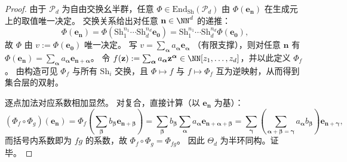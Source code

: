 \begin{proof}
由于 \(\mathcal P_d\) 为自由交换幺半群，任意 \(\Phi\in\mathrm{End}_{\mathrm{Sh}}(\mathcal P_d)\) 由 \(\Phi(\mathbf e_{\mathbf n})\) 在生成元上的取值唯一决定。
交换关系给出对任意 \(\mathbf n\in\NN^d\) 的递推：
\[
\Phi(\mathbf e_{\mathbf n})
=\Phi(\mathrm{Sh}_1^{n_1}\cdots \mathrm{Sh}_d^{n_d}\mathbf e_{\mathbf 0})
=\mathrm{Sh}_1^{n_1}\cdots \mathrm{Sh}_d^{n_d}\Phi(\mathbf e_{\mathbf 0}),
\]
故 \(\Phi\) 由 \(v:=\Phi(\mathbf e_{\mathbf 0})\) 唯一决定。
写
\(
v=\sum_{\boldsymbol\alpha}a_{\boldsymbol\alpha}\mathbf e_{\boldsymbol\alpha}
\)
（有限支撑），则对任意 \(\mathbf n\) 有
\(
\Phi(\mathbf e_{\mathbf n})=\sum_{\boldsymbol\alpha}a_{\boldsymbol\alpha}\mathbf e_{\mathbf n+\boldsymbol\alpha}
\)。
令 \(f(\mathbf z):=\sum_{\boldsymbol\alpha}a_{\boldsymbol\alpha}\mathbf z^{\boldsymbol\alpha}\in\NN[z_1,\dots,z_d]\)，并以此定义 \(\Phi_f\)。
由构造可见 \(\Phi_f\) 与所有 \(\mathrm{Sh}_i\) 交换，且 \(\Phi\mapsto f\) 与 \(f\mapsto \Phi_f\) 互为逆映射，从而得到集合层的双射。
\par
逐点加法对应系数相加显然。
对复合，直接计算（以 \(\mathbf e_{\mathbf n}\) 为基）：
\[
(\Phi_f\circ\Phi_g)(\mathbf e_{\mathbf n})
=\Phi_f\!\left(\sum_{\boldsymbol\beta}b_{\boldsymbol\beta}\mathbf e_{\mathbf n+\boldsymbol\beta}\right)
=\sum_{\boldsymbol\beta}b_{\boldsymbol\beta}\sum_{\boldsymbol\alpha}a_{\boldsymbol\alpha}\mathbf e_{\mathbf n+\boldsymbol\alpha+\boldsymbol\beta}
=\sum_{\boldsymbol\gamma}\left(\sum_{\boldsymbol\alpha+\boldsymbol\beta=\boldsymbol\gamma}a_{\boldsymbol\alpha}b_{\boldsymbol\beta}\right)\mathbf e_{\mathbf n+\boldsymbol\gamma},
\]
而括号内系数即为 \(fg\) 的系数，故 \(\Phi_f\circ\Phi_g=\Phi_{fg}\)。
因此 \(\Theta_d\) 为半环同构。证毕。
\end{proof}

\endinput
